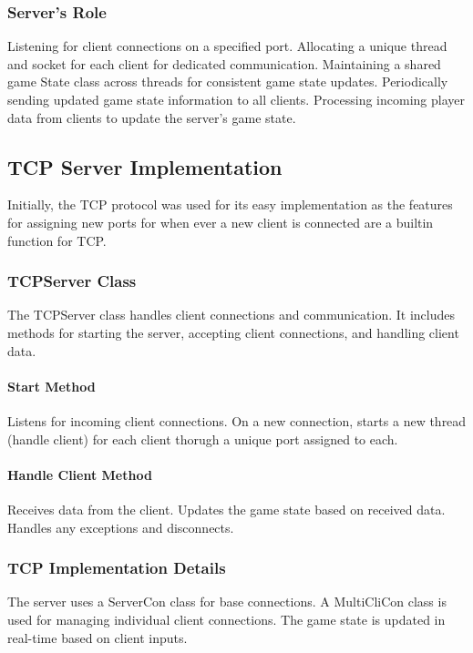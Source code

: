 \subsubsection{Server's Role}

    Listening for client connections on a specified port.
    Allocating a unique thread and socket for each client for dedicated communication.
    Maintaining a shared game State class across threads for consistent game state updates.
    Periodically sending updated game state information to all clients.
    Processing incoming player data from clients to update the server's game state.

\subsection{TCP Server Implementation}
Initially, the TCP protocol was used for its easy implementation as the features for assigning new ports for when ever a new client is connected are a builtin function for TCP.

\subsubsection{TCPServer Class}
The TCPServer class handles client connections and communication. It includes methods for starting the server, accepting client connections, and handling client data.

\paragraph{Start Method}

    Listens for incoming client connections.
    On a new connection, starts a new thread (handle client) for each client thorugh a unique port assigned to each.

\paragraph{Handle Client Method}

    Receives data from the client.
    Updates the game state based on received data.
    Handles any exceptions and disconnects.

\subsubsection{TCP Implementation Details}

    The server uses a ServerCon class for base connections.
    A MultiCliCon class is used for managing individual client connections.
    The game state is updated in real-time based on client inputs.


